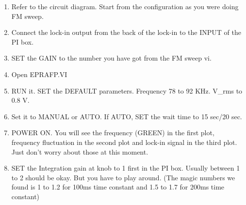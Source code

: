 {\begin{enumerate}
%
%

\item Refer to the circuit diagram. Start from the configuration as you were 
doing FM sweep.

\item Connect the lock-in output from the back of the lock-in to the INPUT of the PI box.

\item SET the GAIN to the number you have got from the FM sweep vi.

\item Open EPRAFP.VI

\item RUN it. SET the DEFAULT parameters. Frequency 78 to 92 KHz. 
V\_rms to 0.8 V.

\item Set it to MANUAL or AUTO. If AUTO, SET the wait time to 15 sec/20 sec.

\item POWER ON. You will see the frequency (GREEN) in the first plot, frequency fluctuation in the second plot and lock-in signal in the third plot. Just don't worry about those at this moment.

\item SET the Integration gain at knob to 1 first in the PI box. Usually between 1 to 2 should be okay. But you have to play around. (The magic numbers we found is 1 to 1.2 for 100ms time constant and 1.5 to 1.7 for 200ms time constant)


\end{enumerate}}
